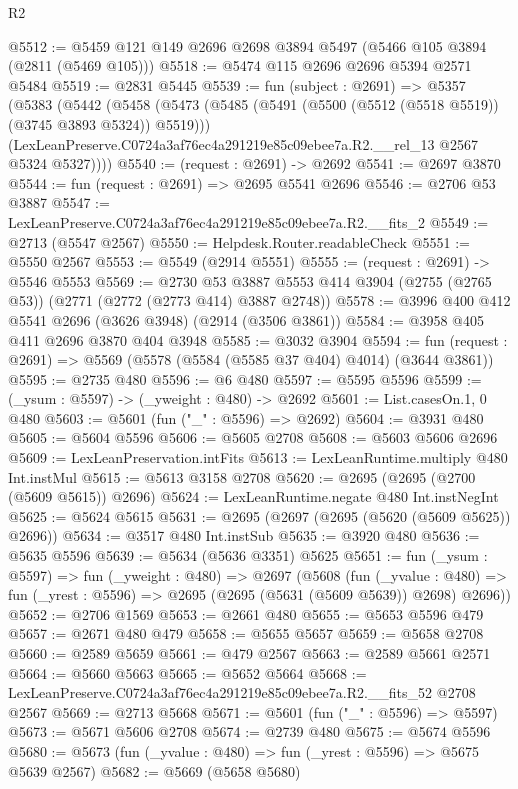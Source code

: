 \begin{lexlean}{R2}
\begin{coremodule}
@5512 := @5459 @121 @149 @2696 @2698 @3894 @5497 (@5466 @105 @3894 (@2811 (@5469 @105)))
@5518 := @5474 @115 @2696 @2696 @5394 @2571 @5484
@5519 := @2831 @5445
@5539 := fun (subject : @2691) =>
  @5357
    (@5383
      (@5442
        (@5458
          (@5473 (@5485 (@5491 (@5500 (@5512 (@5518 @5519)) (@3745 @3893 @5324)) @5519)))
          (LexLeanPreserve.C0724a3af76ec4a291219e85c09ebee7a.R2.__rel_13 @2567 @5324 @5327))))
@5540 := (request : @2691) -> @2692
@5541 := @2697 @3870
@5544 := fun (request : @2691) => @2695 @5541 @2696
@5546 := @2706 @53 @3887
@5547 := LexLeanPreserve.C0724a3af76ec4a291219e85c09ebee7a.R2.__fits_2
@5549 := @2713 (@5547 @2567)
@5550 := Helpdesk.Router.readableCheck
@5551 := @5550 @2567
@5553 := @5549 (@2914 @5551)
@5555 := (request : @2691) -> @5546 @5553
@5569 := @2730
    @53
    @3887
    @5553
    @414
    @3904
    (@2755 (@2765 @53))
    (@2771 (@2772 (@2773 @414) @3887 @2748))
@5578 := @3996 @400 @412 @5541 @2696 (@3626 @3948) (@2914 (@3506 @3861))
@5584 := @3958 @405 @411 @2696 @3870 @404 @3948
@5585 := @3032 @3904
@5594 := fun (request : @2691) => @5569 (@5578 (@5584 (@5585 @37 @404) @4014) (@3644 @3861))
@5595 := @2735 @480
@5596 := @6 @480
@5597 := @5595 @5596
@5599 := (_ysum : @5597) -> (_yweight : @480) -> @2692
@5601 := List.casesOn.{1, 0} @480
@5603 := @5601 (fun ("_" : @5596) => @2692)
@5604 := @3931 @480
@5605 := @5604 @5596
@5606 := @5605 @2708
@5608 := @5603 @5606 @2696
@5609 := LexLeanPreservation.intFits
@5613 := LexLeanRuntime.multiply @480 Int.instMul
@5615 := @5613 @3158 @2708
@5620 := @2695 (@2695 (@2700 (@5609 @5615)) @2696)
@5624 := LexLeanRuntime.negate @480 Int.instNegInt
@5625 := @5624 @5615
@5631 := @2695 (@2697 (@2695 (@5620 (@5609 @5625)) @2696))
@5634 := @3517 @480 Int.instSub
@5635 := @3920 @480
@5636 := @5635 @5596
@5639 := @5634 (@5636 @3351) @5625
@5651 := fun (_ysum : @5597) =>
  fun (_yweight : @480) =>
  @2697
    (@5608
      (fun (_yvalue : @480) =>
      fun (_yrest : @5596) => @2695 (@2695 (@5631 (@5609 @5639)) @2698) @2696))
@5652 := @2706 @1569
@5653 := @2661 @480
@5655 := @5653 @5596 @479
@5657 := @2671 @480 @479
@5658 := @5655 @5657
@5659 := @5658 @2708
@5660 := @2589 @5659
@5661 := @479 @2567
@5663 := @2589 @5661 @2571
@5664 := @5660 @5663
@5665 := @5652 @5664
@5668 := LexLeanPreserve.C0724a3af76ec4a291219e85c09ebee7a.R2.__fits_52 @2708 @2567
@5669 := @2713 @5668
@5671 := @5601 (fun ("_" : @5596) => @5597)
@5673 := @5671 @5606 @2708
@5674 := @2739 @480
@5675 := @5674 @5596
@5680 := @5673 (fun (_yvalue : @480) => fun (_yrest : @5596) => @5675 @5639 @2567)
@5682 := @5669 (@5658 @5680)

\end{coremodule}
\end{lexlean}
